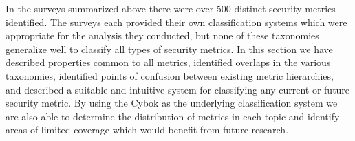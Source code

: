 In the surveys summarized above there were over 500 distinct security metrics identified. The surveys each provided their own classification systems which were appropriate for the analysis they conducted, but none of these taxonomies generalize well to classify all types of security metrics. In this section we have described properties common to all metrics, identified overlaps in the various taxonomies, identified points of confusion between existing metric hierarchies, and described a suitable and intuitive system for classifying any current or future security metric. By using the Cybok as the underlying classification system we are also able to determine the distribution of metrics in each topic and identify areas of limited coverage which would benefit from future research.






